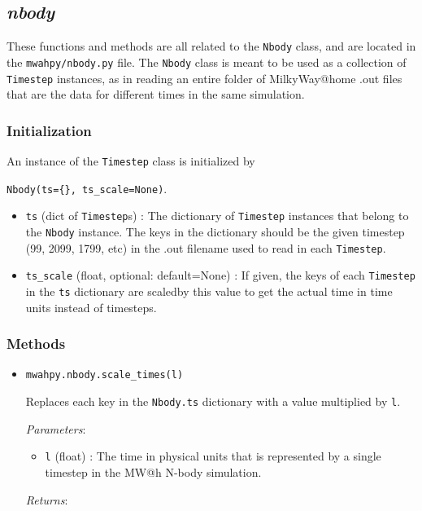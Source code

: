 \documentclass{article}
\begin{document}
\subsection{\textit{nbody}}

These functions and methods are all related to the \verb!Nbody! class, and are located in the \verb!mwahpy/nbody.py! file. The \verb!Nbody! class is meant to be used as a collection of \verb!Timestep! instances, as in reading an entire folder of MilkyWay@home .out files that are the data for different times in the same simulation. 

\subsubsection{Initialization}

An instance of the \verb!Timestep! class is initialized by 

\verb!Nbody(ts={}, ts_scale=None)!.

\begin{itemize}

\item \verb!ts! (dict of \verb!Timestep!s) : The dictionary of \verb!Timestep! instances that belong to the \verb!Nbody! instance. The keys in the dictionary should be the given timestep (99, 2099, 1799, etc) in the .out filename used to read in each \verb!Timestep!.

\item \verb!ts_scale! (float, optional: default=None) : If given, the keys of each \verb!Timestep! in the \verb!ts! dictionary are scaledby this value to get the actual time in time units instead of timesteps. 

\end{itemize}

\subsubsection{Methods}

\begin{itemize}



\item \verb!mwahpy.nbody.scale_times(l)!

Replaces each key in the \verb!Nbody.ts! dictionary with a value multiplied by \verb!l!.

\textit{Parameters}: \begin{itemize}

\item \verb!l! (float) : The time in physical units that is represented by a single timestep in the MW@h N-body simulation.

\end{itemize}

\textit{Returns}:



\end{itemize}
\end{document}
